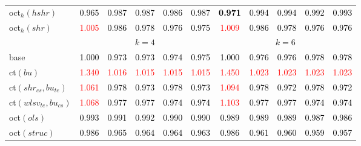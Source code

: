 \begin{tabular}[t]{l|>{}cccc>{}c|ccccc}
oct$_h(hshr)$ & \textcolor{black}{0.965} & \textcolor{black}{0.987} & \textcolor{black}{0.987} & \textcolor{black}{0.986} & \textcolor{black}{0.987} & \textcolor{black}{\textbf{0.971}} & \textcolor{black}{0.994} & \textcolor{black}{0.994} & \textcolor{black}{0.992} & \textcolor{black}{0.993}\\
oct$_h(shr)$ & \textcolor{red}{1.005} & \textcolor{black}{0.986} & \textcolor{black}{0.978} & \textcolor{black}{0.976} & \textcolor{black}{0.975} & \textcolor{red}{1.009} & \textcolor{black}{0.986} & \textcolor{black}{0.978} & \textcolor{black}{0.976} & \textcolor{black}{0.976}\\
\addlinespace[0.3em]
\multicolumn{1}{c}{} & \multicolumn{5}{c}{\textbf{$k = 4$}} & \multicolumn{5}{c}{\textbf{$k = 6$}}\\
base & \textcolor{black}{1.000} & \textcolor{black}{0.973} & \textcolor{black}{0.973} & \textcolor{black}{0.974} & \textcolor{black}{0.975} & \textcolor{black}{1.000} & \textcolor{black}{0.976} & \textcolor{black}{0.976} & \textcolor{black}{0.978} & \textcolor{black}{0.978}\\
ct$(bu)$ & \textcolor{red}{1.340} & \textcolor{red}{1.016} & \textcolor{red}{1.015} & \textcolor{red}{1.015} & \textcolor{red}{1.015} & \textcolor{red}{1.450} & \textcolor{red}{1.023} & \textcolor{red}{1.023} & \textcolor{red}{1.023} & \textcolor{red}{1.023}\\
ct$(shr_{cs}, bu_{te})$ & \textcolor{red}{1.061} & \textcolor{black}{0.978} & \textcolor{black}{0.973} & \textcolor{black}{0.978} & \textcolor{black}{0.973} & \textcolor{red}{1.094} & \textcolor{black}{0.978} & \textcolor{black}{0.972} & \textcolor{black}{0.978} & \textcolor{black}{0.972}\\
ct$(wlsv_{te}, bu_{cs})$ & \textcolor{red}{1.068} & \textcolor{black}{0.977} & \textcolor{black}{0.977} & \textcolor{black}{0.974} & \textcolor{black}{0.974} & \textcolor{red}{1.103} & \textcolor{black}{0.977} & \textcolor{black}{0.977} & \textcolor{black}{0.974} & \textcolor{black}{0.974}\\
oct$(ols)$ & \textcolor{black}{0.993} & \textcolor{black}{0.991} & \textcolor{black}{0.992} & \textcolor{black}{0.990} & \textcolor{black}{0.990} & \textcolor{black}{0.989} & \textcolor{black}{0.989} & \textcolor{black}{0.989} & \textcolor{black}{0.987} & \textcolor{black}{0.986}\\
oct$(struc)$ & \textcolor{black}{0.986} & \textcolor{black}{0.965} & \textcolor{black}{0.964} & \textcolor{black}{0.964} & \textcolor{black}{0.963} & \textcolor{black}{0.986} & \textcolor{black}{0.961} & \textcolor{black}{0.960} & \textcolor{black}{0.959} & \textcolor{black}{0.957}\\

\end{tabular}
